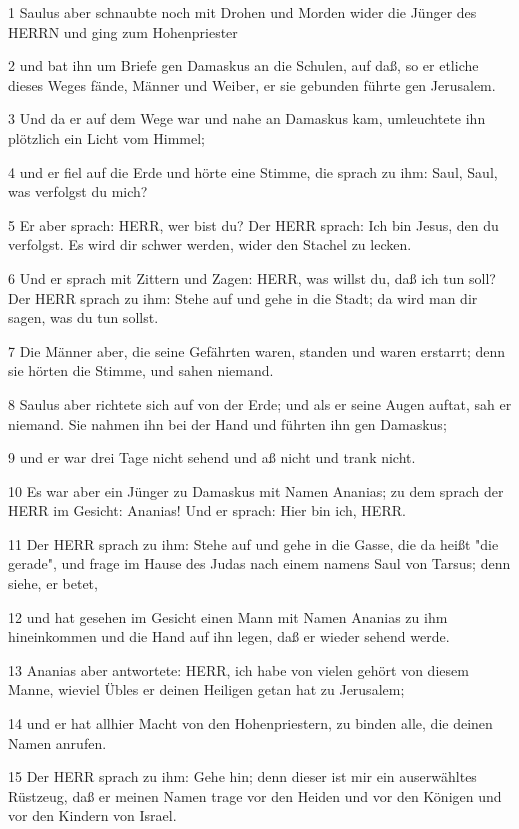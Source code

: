 \par 1 Saulus aber schnaubte noch mit Drohen und Morden wider die Jünger des HERRN und ging zum Hohenpriester
\par 2 und bat ihn um Briefe gen Damaskus an die Schulen, auf daß, so er etliche dieses Weges fände, Männer und Weiber, er sie gebunden führte gen Jerusalem.
\par 3 Und da er auf dem Wege war und nahe an Damaskus kam, umleuchtete ihn plötzlich ein Licht vom Himmel;
\par 4 und er fiel auf die Erde und hörte eine Stimme, die sprach zu ihm: Saul, Saul, was verfolgst du mich?
\par 5 Er aber sprach: HERR, wer bist du? Der HERR sprach: Ich bin Jesus, den du verfolgst. Es wird dir schwer werden, wider den Stachel zu lecken.
\par 6 Und er sprach mit Zittern und Zagen: HERR, was willst du, daß ich tun soll? Der HERR sprach zu ihm: Stehe auf und gehe in die Stadt; da wird man dir sagen, was du tun sollst.
\par 7 Die Männer aber, die seine Gefährten waren, standen und waren erstarrt; denn sie hörten die Stimme, und sahen niemand.
\par 8 Saulus aber richtete sich auf von der Erde; und als er seine Augen auftat, sah er niemand. Sie nahmen ihn bei der Hand und führten ihn gen Damaskus;
\par 9 und er war drei Tage nicht sehend und aß nicht und trank nicht.
\par 10 Es war aber ein Jünger zu Damaskus mit Namen Ananias; zu dem sprach der HERR im Gesicht: Ananias! Und er sprach: Hier bin ich, HERR.
\par 11 Der HERR sprach zu ihm: Stehe auf und gehe in die Gasse, die da heißt "die gerade", und frage im Hause des Judas nach einem namens Saul von Tarsus; denn siehe, er betet,
\par 12 und hat gesehen im Gesicht einen Mann mit Namen Ananias zu ihm hineinkommen und die Hand auf ihn legen, daß er wieder sehend werde.
\par 13 Ananias aber antwortete: HERR, ich habe von vielen gehört von diesem Manne, wieviel Übles er deinen Heiligen getan hat zu Jerusalem;
\par 14 und er hat allhier Macht von den Hohenpriestern, zu binden alle, die deinen Namen anrufen.
\par 15 Der HERR sprach zu ihm: Gehe hin; denn dieser ist mir ein auserwähltes Rüstzeug, daß er meinen Namen trage vor den Heiden und vor den Königen und vor den Kindern von Israel.

